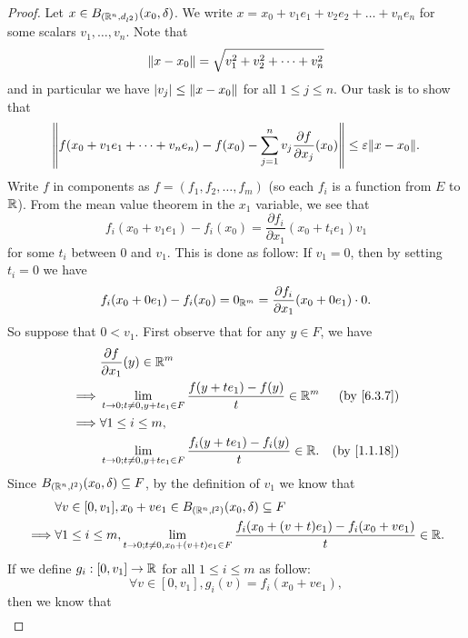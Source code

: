 \begin{proof}
  Let \(x \in B_{(\R^n, d_{l^2})}(x_0, \delta)\).
  We write \(x = x_0 + v_1 e_1 + v_2 e_2 + \dots + v_n e_n\) for some scalars \(v_1, \dots, v_n\).
  Note that
  \[
    \norm*{x - x_0} = \sqrt{v_1^2 + v_2^2 + \dots + v_n^2}
  \]
  and in particular we have \(\abs{v_j} \leq \norm*{x - x_0}\) for all \(1 \leq j \leq n\).
  Our task is to show that
  \[
    \norm*{f(x_0 + v_1 e_1 + \dots + v_n e_n) - f(x_0) - \sum_{j = 1}^n v_j \frac{\partial f}{\partial x_j}(x_0)} \leq \varepsilon \norm*{x - x_0}.
  \]
  Write \(f\) in components as \(f = (f_1 , f_2, \dots, f_m)\)
  (so each \(f_i\) is a function from \(E\) to \(\R\)).
  From the mean value theorem in the \(x_1\) variable, we see that
  \[
    f_i(x_0 + v_1 e_1) - f_i(x_0) = \frac{\partial f_i}{\partial x_1}(x_0 + t_i e_1) v_1
  \]
  for some \(t_i\) between \(0\) and \(v_1\).
  This is done as follow:
  If \(v_1 = 0\), then by setting \(t_i = 0\) we have
  \[
    f_i(x_0 + 0 e_1) - f_i(x_0) = 0_{\R^m} = \frac{\partial f_i}{\partial x_1}(x_0 + 0 e_1) \cdot 0.
  \]
  So suppose that \(0 < v_1\).
  First observe that for any \(y \in F\), we have
  \begin{align*}
             & \frac{\partial f}{\partial x_1}(y) \in \R^m                                                                      \\
    \implies & \lim_{t \to 0 ; t \neq 0, y + t e_1 \in F} \frac{f(y + t e_1) - f(y)}{t} \in \R^m    & \text{(by \cref{6.3.7})}  \\
    \implies & \forall 1 \leq i \leq m,                                                                                         \\
             & \lim_{t \to 0 ; t \neq 0, y + t e_1 \in F} \frac{f_i(y + t e_1) - f_i(y)}{t} \in \R. & \text{(by \cref{1.1.18})}
  \end{align*}
  Since \(B_{(\R^n, l^2)}(x_0, \delta) \subseteq F\), by the definition of \(v_1\) we know that
  \begin{align*}
             & \forall v \in [0, v_1], x_0 + v e_1 \in B_{(\R^n, l^2)}(x_0, \delta) \subseteq F                                                        \\
    \implies & \forall 1 \leq i \leq m, \lim_{t \to 0 ; t \neq 0, x_0 + (v + t) e_1 \in F} \frac{f_i(x_0 + (v + t) e_1) - f_i(x_0 + v e_1)}{t} \in \R.
  \end{align*}
  If we define \(g_i : [0, v_1] \to \R\) for all \(1 \leq i \leq m\) as follow:
  \[
    \forall v \in [0, v_1], g_i(v) = f_i(x_0 + v e_1),
  \]
  then we know that
  \begin{align*}

\end{align*}
\end{proof}
